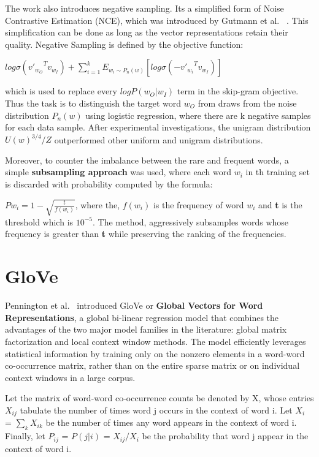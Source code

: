 The work also introduces negative sampling. Its a simplified form of Noise Contrastive Estimation (NCE), which was introduced by Gutmann et al. ~\parencite{gutmann}. This simplification can be done as long as the vector representations retain their quality. Negative Sampling is defined by the objective function:

\begin{center}
$log  \sigma ({{v'}_{{w}_{O}}}^{T} {v}_{{w}_{I}}) +  \sum_{i=1}^{k} {E}_{{w}_{i}  \sim {P}_{n}(w)} [log \sigma ({{-v'}_{{w}_{i}}}^{T} {v}_{{w}_{I}})]$
\end{center}

which is used to replace every $log P({w}_{O}| {w}_{I})$ term in the skip-gram objective. Thus the task is to distinguish the target word ${w}_{O}$ from draws from the noise distribution ${P}_{n}(w)$ using logistic regression, where there are k negative samples for each data sample. After experimental investigations, the unigram distribution $U{(w)}^{3/4}/Z$ outperformed other uniform and unigram distributions.
\newline

Moreover, to counter the imbalance between the rare and frequent words, a simple \textbf{subsampling approach} was used, where each word ${w}_{i}$ in th training set is discarded with probability computed by the formula:

$P{w}_{i} = 1 -  \sqrt{\frac{t}{f({w}_{i})}}  $, where the, $f({w}_{i})$ is the frequency of word ${w}_{i}$ and \textbf{ t } is the threshold which is ${10}^{-5}$. The method, aggressively subsamples words whose frequency is greater than \textbf{ t} while preserving the ranking of the frequencies. 

\section{GloVe}
Pennington et al.~\parencite{glove} introduced GloVe or \textbf{Global Vectors for Word Representations}, a global bi-linear regression model that combines the advantages of the two major model families in the literature: global matrix factorization and local context window methods. The model efficiently leverages statistical information by training only on the nonzero elements in a word-word co-occurrence matrix, rather than on the entire sparse matrix or on individual context windows in a large corpus.

Let the matrix of word-word co-occurrence counts be denoted by X, whose entries  ${X}_{ij}$ tabulate the number of times word j occurs in the context of word i. Let  ${X}_{i}$ = $\sum_{k} {X}_{ik}$ be the number of times any word appears in the context of word i. Finally, let ${P}_{ij}$ = $P(j | i)$ = ${X}_{ij}/{X}_{i}$ be the probability that word j appear in the context of word i.

